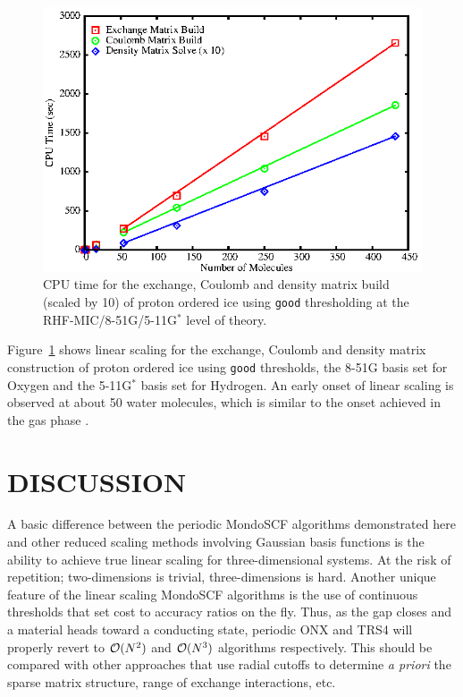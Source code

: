 \documentclass[prb,aps,nobibnotes,twocolumn,doublespace,twocolumngrid,superbib]{revtex4}
\begin{document}
\begin{figure}[h]
\caption{CPU time for the exchange, Coulomb and density 
matrix build (scaled by 10) of proton ordered ice using {\tt good}
thresholding at the RHF-MIC/8-51G/5-11G$^*$ level of theory.}
\label{IceScaling}
{\centering \includegraphics{Timing_pIce_ONX_1.ps} \par} 
\end{figure}

Figure~\ref{IceScaling} shows linear scaling for the exchange, Coulomb and density matrix
construction of proton ordered ice \cite{} using {\tt good} thresholds, the 8-51G basis set
for Oxygen and the 5-11G$^*$ basis set for Hydrogen.  An early onset of linear scaling 
is observed at about 50 water molecules, which is similar to the onset achieved in the gas 
phase \cite{ANiklasson03}.

\section{DISCUSSION}\label{discussion}

A basic difference between the periodic {\sc MondoSCF} algorithms demonstrated 
here and other reduced scaling methods involving Gaussian basis functions is the 
ability to achieve true linear scaling for three-dimensional systems.  At the risk
of repetition; two-dimensions is trivial, three-dimensions is hard.  Another unique
feature of the linear scaling {\sc MondoSCF} algorithms is the use of continuous
thresholds that set cost to accuracy ratios on the fly.  Thus, as the gap closes and
a material heads toward a conducting state, periodic {\sc ONX} and {\sc TRS4} will
properly revert to ${\cal O}(N^2)$ and ${\cal O}(N^3)$ algorithms respectively.  This
should be compared with other approaches that use radial cutoffs to determine {\em a priori} 
the sparse matrix structure, range of exchange interactions, etc. 
\end{document}
